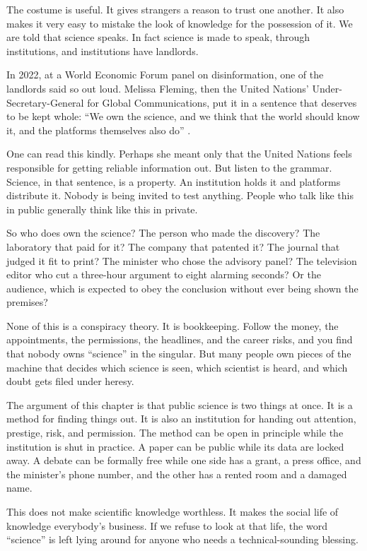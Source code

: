 \documentclass[12pt,a4paper]{book}
\begin{document}
The costume is useful. It gives strangers a reason to trust one another. It also makes it very easy to mistake the look of knowledge for the possession of it. We are told that science speaks. In fact science is made to speak, through institutions, and institutions have landlords.

In 2022, at a World Economic Forum panel on disinformation, one of the landlords said so out loud. Melissa Fleming, then the United Nations' Under-Secretary-General for Global Communications, put it in a sentence that deserves to be kept whole: ``We own the science, and we think that the world should know it, and the platforms themselves also do'' \cite{FlemingMelissa}.

One can read this kindly. Perhaps she meant only that the United Nations feels responsible for getting reliable information out. But listen to the grammar. Science, in that sentence, is a property. An institution holds it and platforms distribute it. Nobody is being invited to test anything. People who talk like this in public generally think like this in private.

So who does own the science? The person who made the discovery? The laboratory that paid for it? The company that patented it? The journal that judged it fit to print? The minister who chose the advisory panel? The television editor who cut a three-hour argument to eight alarming seconds? Or the audience, which is expected to obey the conclusion without ever being shown the premises?

None of this is a conspiracy theory. It is bookkeeping. Follow the money, the appointments, the permissions, the headlines, and the career risks, and you find that nobody owns ``science'' in the singular. But many people own pieces of the machine that decides which science is seen, which scientist is heard, and which doubt gets filed under heresy.

The argument of this chapter is that public science is two things at once. It is a method for finding things out. It is also an institution for handing out attention, prestige, risk, and permission. The method can be open in principle while the institution is shut in practice. A paper can be public while its data are locked away. A debate can be formally free while one side has a grant, a press office, and the minister's phone number, and the other has a rented room and a damaged name.

This does not make scientific knowledge worthless. It makes the social life of knowledge everybody's business. If we refuse to look at that life, the word ``science'' is left lying around for anyone who needs a technical-sounding blessing.
\end{document}
